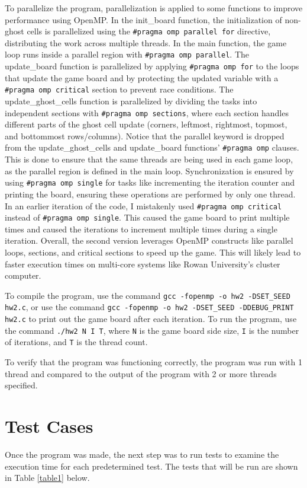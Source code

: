 \documentclass{article}
\begin{document}
	To parallelize the program, parallelization is applied to some functions to improve performance using OpenMP. In the init\_board function, the initialization of non-ghost cells is parallelized using the \texttt{\#pragma omp parallel for} directive, distributing the work across multiple threads. In the main function, the game loop runs inside a parallel region with \texttt{\#pragma omp parallel}. The update\_board function is parallelized by applying \texttt{\#pragma omp for} to the loops that update the game board and by protecting the updated variable with a \texttt{\#pragma omp critical} section to prevent race conditions. The update\_ghost\_cells function is parallelized by dividing the tasks into independent sections with \texttt{\#pragma omp sections}, where each section handles different parts of the ghost cell update (corners, leftmost, rightmost, topmost, and bottommost rows/columns). Notice that the parallel keyword is dropped from the update\_ghost\_cells and update\_board functions’ \texttt{\#pragma omp} clauses. This is done to ensure that the same threads are being used in each game loop, as the parallel region is defined in the main loop. Synchronization is ensured by using \texttt{\#pragma omp single} for tasks like incrementing the iteration counter and printing the board, ensuring these operations are performed by only one thread. In an earlier iteration of the code, I mistakenly used \texttt{\#pragma omp critical} instead of \texttt{\#pragma omp single}. This caused the game board to print multiple times and caused the iterations to increment multiple times during a single iteration. Overall, the second version leverages OpenMP constructs like parallel loops, sections, and critical sections to speed up the game. This will likely lead to faster execution times on multi-core systems like Rowan University’s cluster computer.
	
	To compile the program, use the command \texttt{gcc -fopenmp -o hw2 -DSET\_SEED hw2.c}, or use the command \texttt{gcc -fopenmp -o hw2 -DSET\_SEED -DDEBUG\_PRINT hw2.c} to print out the game board after each iteration. To run the program, use the command \texttt{./hw2 N I T}, where \texttt{N} is the game board side size, \texttt{I} is the number of iterations, and \texttt{T} is the thread count.
	
	To verify that the program was functioning correctly, the program was run with 1 thread and compared to the output of the program with 2 or more threads specified.

	\section{Test Cases}
	Once the program was made, the next step was to run tests to examine the execution time for each predetermined test. The tests that will be run are shown in Table \ref{table1} below.
\end{document}
